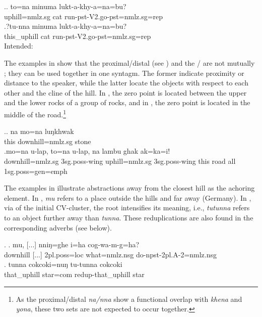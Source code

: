 \ex.\ag. to=na minuma lukt-a-khy-a=na=bu?\\
uphill{\sc =nmlz.sg} cat run{\sc [3sg]-pst-V2.go-pst=nmlz.sg=rep} \\
\bg.?tu-nna minuma lukt-a-khy-a=na=bu?\\
this\_uphill cat run{\sc [3sg]-pst-V2.go-pst=nmlz.sg=rep} \\
Intended: 
 
The examples in \Next show that the proximal/distal  (see  ) and the /  are not mutually ; they can be used together in one syntagm. The former indicate proximity or distance to the speaker, while the latter locate the objects with respect to each other and the cline of the hill. In \Next[a], the zero point is located between the upper and the lower rocks of a group of rocks, and in \Next[b], the zero point is located in the middle of the road.\footnote{As the proximal/distal  \emph{na/nna} show a functional overlap with \emph{khena} and \emph{yona}, these two sets are not expected to occur together.}

\ex.\ag.  na   mo=na  luŋkhwak\\
this downhill{\sc =nmlz.sg} stone\\
 
\bg.mo=na  u-lap,          to=na  u-lap,          na   lambu ghak ak=ka=i!\\
downhill{\sc =nmlz.sg} {\sc 3sg.poss-}wing uphill{\sc =nmlz.sg}  {\sc 3sg.poss-}wing this road all {\sc 1sg.poss=gen=emph}\\
  


The examples in \Next illustrate abstractions away from the closest hill as the achoring element. In \Next[a],  \emph{mu} refers to a place outside the hills and far away (Germany). In \Next[b], via  of the initial CV-cluster, the root  intensifies its meaning, i.e., \emph{tutunna} refers to an object further away than \emph{tunna}. These reduplications are also found in the corresponding adverbs (see  below). 

\ex. \ag. mu, [...] nniŋ=ghe i=ha cog-wa-m-g=ha?\\
	downhill [...] {\sc 2pl.poss=loc} what{\sc =nmlz.nsg} do{\sc -npst-2pl.A-2=nmlz.nsg}\\
	 
\bg. tunna cokcoki=nuŋ tu-tunna cokcoki\\
		that\_uphill star{\sc =com}	{\sc redup-}that\_uphill star\\


